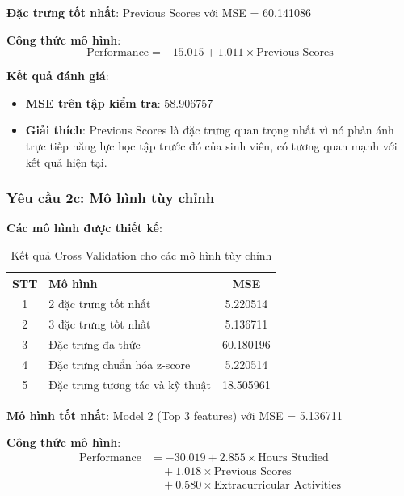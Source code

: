 \textbf{Đặc trưng tốt nhất}: Previous Scores với MSE = 60.141086

\textbf{Công thức mô hình}:
\begin{equation}
	\text{Performance} = -15.015 + 1.011 \times \text{Previous Scores}
\end{equation}

\textbf{Kết quả đánh giá}:
\begin{itemize}
	\item \textbf{MSE trên tập kiểm tra}: 58.906757
	\item \textbf{Giải thích}: Previous Scores là đặc trưng quan trọng nhất vì nó phản ánh trực tiếp năng lực học tập trước đó của sinh viên, có tương quan mạnh với kết quả hiện tại.
\end{itemize}

\subsubsection{Yêu cầu 2c: Mô hình tùy chỉnh}

\textbf{Các mô hình được thiết kế}:

\begin{table}[H]
	\centering
	\begin{tabular}{|c|l|c|}
		\hline
		\textbf{STT} & \textbf{Mô hình}                & \textbf{MSE} \\
		\hline
		1            & 2 đặc trưng tốt nhất            & 5.220514     \\
		\hline
		2            & 3 đặc trưng tốt nhất            & 5.136711     \\
		\hline
		3            & Đặc trưng đa thức               & 60.180196    \\
		\hline
		4            & Đặc trưng chuẩn hóa z-score     & 5.220514     \\
		\hline
		5            & Đặc trưng tương tác và kỹ thuật & 18.505961    \\
		\hline
	\end{tabular}
	\caption{Kết quả Cross Validation cho các mô hình tùy chỉnh}
	\label{tab:custom_models}
\end{table}

\textbf{Mô hình tốt nhất}: Model 2 (Top 3 features) với MSE = 5.136711

\textbf{Công thức mô hình}:
\begin{align}
	\text{Performance} & = -30.019 + 2.855 \times \text{Hours Studied} \nonumber \\
	                   & \quad + 1.018 \times \text{Previous Scores} \nonumber   \\
	                   & \quad + 0.580 \times \text{Extracurricular Activities}
\end{align}

